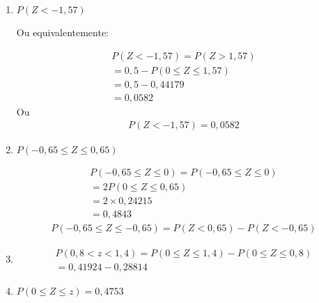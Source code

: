 \begin{example}
\begin{enumerate}[label=(\alph*)]
        \item $ P(Z< -1,57)$
          \begin{figure}[H]
            \centering
            
          \end{figure}

          Ou equivalentemente:
          \begin{figure}[H]
            \centering
            
          \end{figure}
          \begin{align*}
            P(Z< -1,57) = P(Z> 1,57)\\
            =0,5 - P(0 \leq Z \leq 1,57) \\
            = 0,5 - 0,44179 \\
            = 0,0582
          \end{align*}
          Ou 
          \begin{align*}
            P(Z < -1,57) = 0,0582
          \end{align*}
        \item $P(-0,65 \leq Z \leq 0,65)$
          \begin{figure}[H]
            \centering
            
          \end{figure}

          \begin{align*}
            P(-0,65 \leq Z \leq 0) = P(-0,65 \leq Z \leq 0) \\
            =2 P(0 \leq Z \leq 0,65) \\
            =2 \times 0,24215 \\
            =0,4843
          \end{align*}
          \begin{align*}
            P( -0,65 \leq Z \leq -0,65 ) = P(Z < 0,65) - P(Z < -0,65)
          \end{align*}
        \item 
          \begin{figure}[H]
            \centering
            
          \end{figure}

          \begin{align*}
            P(0,8 < z < 1,4)  = P(0 \leq Z \leq 1,4) - P(0 \leq Z \leq 0,8) \\
            = 0,41924 - 0,28814
          \end{align*}
        \item $P(0 \leq Z \leq z) = 0,4753$
          \begin{figure}[H]
            \centering
            
          \end{figure}


\end{enumerate}
\end{example}
